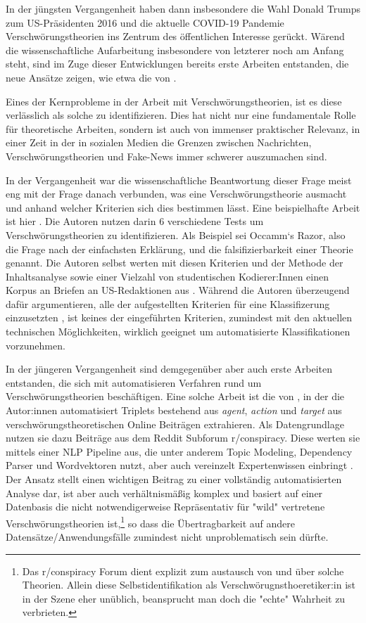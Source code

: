 In der jüngsten Vergangenheit haben dann insbesondere die Wahl Donald Trumps zum US-Präsidenten 2016 und die aktuelle COVID-19 Pandemie Verschwörungstheorien ins Zentrum des öffentlichen Interesse gerückt.
Wärend die wissenschaftliche Aufarbeitung insbesondere von letzterer noch am Anfang steht, sind im Zuge dieser Entwicklungen bereits erste Arbeiten entstanden, die neue Ansätze zeigen, wie etwa die von \textcite{shahsavari_2020}.

Eines der Kernprobleme in der Arbeit mit Verschwörungstheorien, ist es diese verlässlich als solche zu identifizieren.
Dies hat nicht nur eine fundamentale Rolle für theoretische Arbeiten, sondern ist auch von immenser praktischer Relevanz, in einer Zeit in der in sozialen Medien die Grenzen zwischen Nachrichten, Verschwörungstheorien und Fake-News immer schwerer auszumachen sind.

In der Vergangenheit war die wissenschaftliche Beantwortung dieser Frage meist eng mit der Frage danach verbunden, was eine Verschwörungstheorie ausmacht und anhand welcher Kriterien sich dies bestimmen lässt.
Eine beispielhafte Arbeit ist hier \textcite{uscinski_2014}.
Die Autoren nutzen darin 6 verschiedene Tests um Verschwörungstheorien zu identifizieren. Als Beispiel sei Occamm`s Razor, also die Frage nach der einfachsten Erklärung, und die falsifizierbarkeit einer Theorie genannt.
Die Autoren selbst werten mit diesen Kriterien und der Methode der Inhaltsanalyse sowie einer Vielzahl von studentischen Kodierer:Innen einen Korpus an Briefen an US-Redaktionen aus \parencite[54ff]{uscinski_2014}.
Während die Autoren überzeugend dafür argumentieren, alle der aufgestellten Kriterien für eine Klassifizerung einzusetzten \parencite[52f]{uscinski_2014}, ist keines der eingeführten Kriterien, zumindest mit den aktuellen technischen Möglichkeiten, wirklich geeignet um automatisierte Klassifikationen vorzunehmen.

In der jüngeren Vergangenheit sind demgegenüber aber auch erste Arbeiten entstanden, die sich mit automatisieren Verfahren rund um Verschwörungstheorien beschäftigen.
Eine solche Arbeit ist die von \textcite{samory_2018}, in der die Autor:innen automatisiert Triplets bestehend aus \textit{agent}, \textit{action} und \textit{target} aus verschwörungstheoretischen Online Beiträgen extrahieren.
Als Datengrundlage nutzen sie dazu Beiträge aus dem Reddit Subforum r/conspiracy.
Diese werten sie mittels einer NLP Pipeline aus, die unter anderem Topic Modeling, Dependency Parser und Wordvektoren nutzt, aber auch vereinzelt Expertenwissen einbringt \parencite[][6ff]{samory_2018}.
Der Ansatz stellt einen wichtigen Beitrag zu einer vollständig automatisierten Analyse dar, ist aber auch verhältnismäßig komplex und basiert auf einer Datenbasis die nicht notwendigerweise Repräsentativ für "wild" vertretene Verschwörungstheorien ist,\footnote{Das r/conspiracy Forum dient explizit zum austausch von und über solche Theorien. Allein diese Selbstidentifikation als Verschwörugnsthoeretiker:in ist in der Szene eher unüblich, beansprucht man doch die "echte" Wahrheit zu verbrieten.} so dass die Übertragbarkeit auf andere Datensätze/Anwendungsfälle zumindest nicht unproblematisch sein dürfte.

